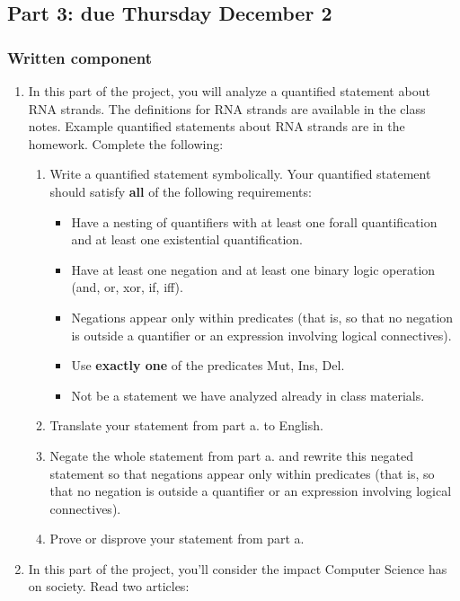\documentclass[12pt, oneside]{article}
\begin{document}
\newpage
\subsection*{Part 3: due Thursday December 2}
\subsubsection*{Written component}
\begin{enumerate}
    \item In this part of the project, you will analyze a quantified statement about RNA strands. 
    The definitions for RNA strands are available in the class notes. 
    Example quantified statements about RNA strands are in the homework. 
    Complete the following:
    \begin{enumerate}
        \item Write a quantified statement symbolically. Your quantified statement should satisfy {\bf all} of the following requirements:
            \begin{itemize}
                \item Have a nesting of quantifiers with at least one forall quantification 
                and at least one existential quantification.
                \item Have at least one negation and at least one binary logic operation (and, or, xor, if, iff).
                \item Negations appear only within predicates (that is, so that no negation is outside 
                a quantifier or an expression involving logical connectives).
                \item Use {\bf exactly one} of the predicates Mut, Ins, Del.
                \item Not be a statement we have analyzed already in class materials.
            \end{itemize}
        \item Translate your statement from part a. to English.
        \item Negate the whole statement from part a. and rewrite this negated statement so 
        that negations appear only within predicates (that is, so that no negation is outside a 
        quantifier or an expression involving logical connectives).
        \item Prove or disprove your statement from part a.
    \end{enumerate}
    \item In this part of the project, you'll consider the impact Computer Science has on society.
    Read two articles:


\end{enumerate}
\end{document}
